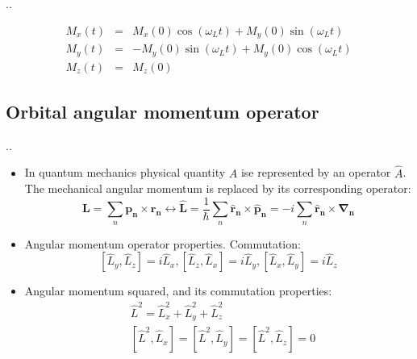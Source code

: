 \documentclass[handout]{beamer}
\begin{document}
\begin{frame}{\thesection.\thesubsection. \insertsubsection}
\begin{itemize}[<+>]
			\begin{equation} 
			\begin{array}{lcl}
			M_x(t) &=& M_x(0) \cos(\omega_L t) + M_y(0) \sin (\omega_L t) \\
			M_y(t) &=& -M_y(0) \sin(\omega_L t) + M_y(0) \cos (\omega_L t) \\
			M_z(t) &=& M_z(0) 
			\end{array}
			\end{equation}
		
		
	\end{itemize}
		
\end{frame}

\subsection{Orbital angular momentum operator}
\begin{frame}{\thesection.\thesubsection. \insertsubsection}
	
	\begin{itemize}[<+>]
		\item     In quantum mechanics physical quantity $A$ ise represented by an operator $\hat{A}$. The mechanical angular momentum is replaced by its corresponding operator:
		\begin{equation}
		\bm{L} = \sum_{n} \bm{p_n} \times \bm{r_n}  \longleftrightarrow \bm{\hat{L}} = \dfrac{1}{\hbar} \sum_{n} \bm{\hat{r}_n} \times \bm{\hat{p}_n} =   -i \sum_{n} \bm{\hat{r}_n} \times \bm{\nabla_n}
		\end{equation}
		\item Angular momentum operator properties. Commutation:
		\begin{equation}\label{eq:Lz_commutation}
		  [\hat{L}_y,\hat{L}_z] = i\hat{L}_x, [\hat{L}_z,\hat{L}_x] = i\hat{L}_y, [\hat{L}_x,\hat{L}_y] = i\hat{L}_z
    	\end{equation}
		\item Angular momentum squared, and its commutation properties:
        \begin{align}
          &\hat{L}^2 = \hat{L}_x^2 + \hat{L}_y^2 + \hat{L}_z^2 \\
          &[\hat{L}^2, \hat{L}_x]=[\hat{L}^2, \hat{L}_y]=[\hat{L}^2, \hat{L}_z]= 0       
        \end{align}        
	\end{itemize}

\end{frame}
\end{document}
